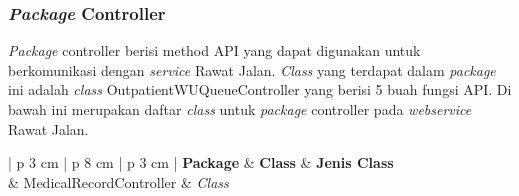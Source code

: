 \subsubsection{\textit{Package} Controller}
\textit{Package} controller berisi method API yang dapat digunakan untuk berkomunikasi dengan \textit{service} Rawat Jalan. \textit{Class} yang terdapat dalam \textit{package} ini adalah \textit{class} OutpatientWUQueueController yang berisi 5 buah fungsi API. Di bawah ini merupakan daftar \textit{class} untuk \textit{package} controller pada \textit{webservice} Rawat Jalan.
\begin{table}[H]
	\small
	\centering
	\caption{Daftar {\itshape Class} pada {\itshape Package} Controller}
	\begin{adjustbox}{width=1\textwidth}
		\begin{tabular}{| p {3 cm} | p {8 cm} | p {3 cm} |}
			\hline
			{\bfseries Package} & {\bfseries Class} & {\bfseries Jenis Class} \\
			\hline
			 & MedicalRecordController & {\itshape Class} \\
			\hline
		\end{tabular}
	\end{adjustbox}
\end{table}
